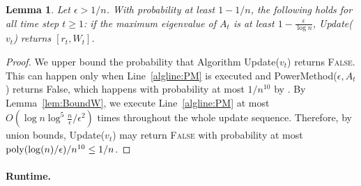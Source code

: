 \documentclass[11pt]{article}
\newtheorem{lemma}[theorem]{Lemma}
\newcommand\poly{\mathrm{poly}}  \newcommand{\comp}[1]{\overline{#1}}
\newcommand\vv{\boldsymbol{\mathit{v}}}
\renewcommand\AA{\boldsymbol{\mathit{A}}}
\newcommand\WW{\boldsymbol{\mathit{W}}}
\begin{document}
\begin{lemma}\label{lem:DynCorrectAns}
Let $\epsilon>1/n$. With probability at least $1-1/n$, the following holds for all time step $t \ge 1$: 
if the maximum eigenvalue of $\AA_t$ is at least $1-\frac{\epsilon}{\log n}$, {\sc Update}($\vv_t$) returns $[r_t,\WW_t]$.
\end{lemma}
\begin{proof}
We upper bound the probability that Algorithm {\sc Update}($\vv_t$) returns \textsc{False}. This can happen only when  Line~\ref{algline:PM} is executed and {\sc PowerMethod}($\epsilon,\AA_t$) returns {\sc False}, which happens with probability at most $1/n^{10}$ by .
By Lemma~\ref{lem:BoundW}, we execute Line~\ref{algline:PM} at most $O(\log n\log^5\frac{n}{\epsilon}/\epsilon^2)$ times throughout the whole update sequence. Therefore, by union bounds, {\sc Update}($\vv_t$) may return \textsc{False} with probability at most $\poly(\log(n)/\eps)/n^{10} \le 1/n$.
\end{proof}



\paragraph{Runtime.}\label{sec:runtime}
\end{document}
